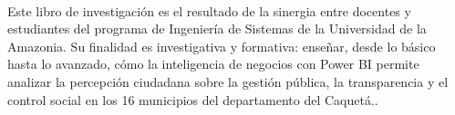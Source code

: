 
\thispagestyle{empty}
~\vfill
\begin{destacado}
\noindent Este libro de investigación es el resultado de la sinergia entre docentes y estudiantes del programa de Ingeniería de Sistemas de la Universidad de la Amazonia. Su finalidad es investigativa y formativa: enseñar, desde lo básico hasta lo avanzado, cómo la inteligencia de negocios con Power BI permite analizar la percepción ciudadana sobre la gestión pública, la transparencia y el control social en los 16 municipios del departamento del Caquetá..
\end{destacado}
\vfill
\cleardoublepage
